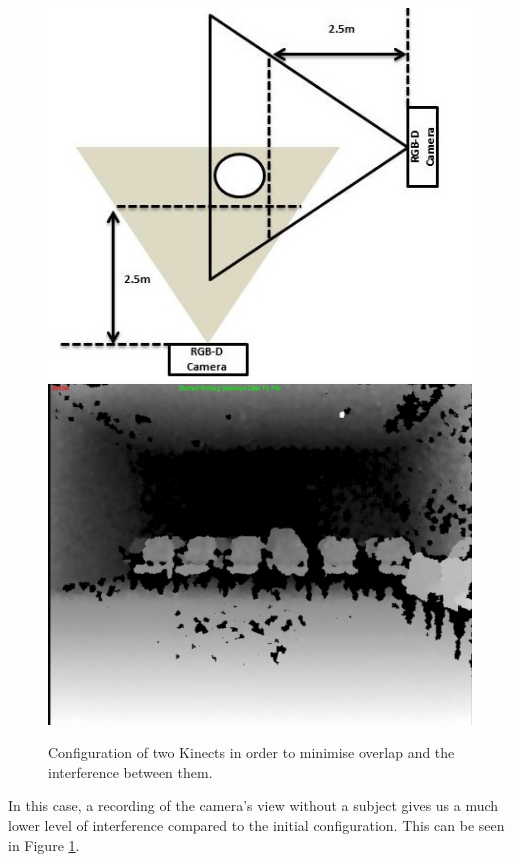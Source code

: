 \documentclass[11pt,a4paper]{article}
\begin{document}
\begin{figure}[H]
\centering
\includegraphics[scale=0.4]{figure_2cameras.jpg}
\includegraphics[scale=0.16]{IR_Interference90deg.jpg}

\caption{Configuration of two Kinects in order to minimise overlap and the interference between them.}
\label{2_cameras_config2}
\end{figure}

\noindent
In this case, a recording of the camera's view without a subject gives us a much lower level of interference compared to the initial configuration. This can be seen in Figure \ref{2_cameras_config2}.
  
\end{document}
